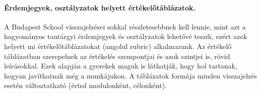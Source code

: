 \paragraph{Érdemjegyek, osztályzatok helyett értékelőtáblázatok.} A Budapest School visszajelzései sokkal részletesebbnek kell lennie, mint azt a hagyományos tantárgyi érdemjegyek és osztályzatok lehetővé teszik, ezért azok helyett mi értékelőtáblázatokat (angolul rubric) alkalmazunk. Az értékelő táblázatban szerepelnek az értékelés szempontjai és azok szintjei is, rövid leírásokkal. Ezek alapján a gyerekek maguk is láthatják, hogy hol tartanak, hogyan javíthatnak még a munkájukon. A táblázatok formája minden visszajelzés esetén változtatható (értsd modulonként, célonként).
